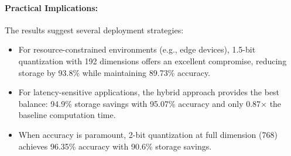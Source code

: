 \paragraph{Practical Implications:}
The results suggest several deployment strategies:
\begin{itemize}
    \item For resource-constrained environments (e.g., edge devices), 1.5-bit quantization with 192 dimensions offers an excellent compromise, reducing storage by 93.8\% while maintaining 89.73\% accuracy.
    \item For latency-sensitive applications, the hybrid approach provides the best balance: 94.9\% storage savings with 95.07\% accuracy and only 0.87× the baseline computation time.
    \item When accuracy is paramount, 2-bit quantization at full dimension (768) achieves 96.35\% accuracy with 90.6\% storage savings.
\end{itemize}

